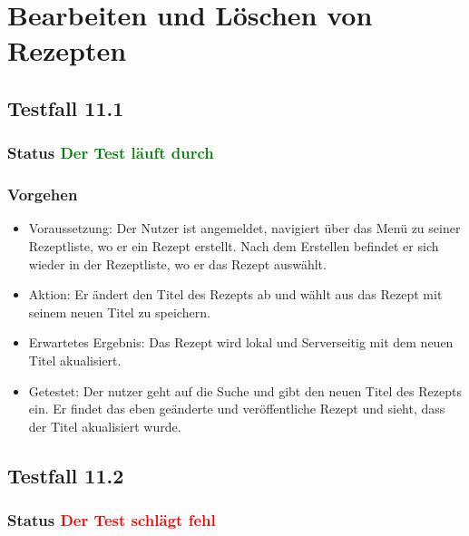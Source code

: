 \section{Bearbeiten und Löschen von Rezepten}


\subsection{Testfall 11.1}
\subsubsection{Status \textcolor{green}{ Der Test läuft durch} }
\subsubsection{Vorgehen}
\begin{itemize}
\item Voraussetzung: Der Nutzer ist angemeldet, navigiert über das Menü zu seiner Rezeptliste, wo er ein Rezept erstellt. Nach dem Erstellen befindet er sich wieder in der Rezeptliste, wo er das Rezept auswählt.
\item Aktion:  Er ändert den Titel des Rezepts ab und wählt aus das Rezept mit seinem neuen Titel zu speichern.
\item Erwartetes Ergebnis: Das Rezept wird lokal und Serverseitig mit dem neuen Titel akualisiert. 
\item Getestet: Der nutzer geht auf die Suche und gibt den neuen Titel des Rezepts ein. Er findet das eben geänderte und veröffentliche Rezept und sieht, dass der Titel akualisiert wurde. 
\end{itemize}

\subsection{Testfall 11.2}
\subsubsection{Status \textcolor{red}{ Der Test schlägt fehl} }
